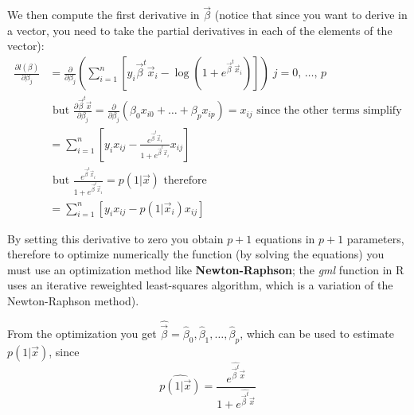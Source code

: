     We then compute the first derivative in $\vec{\beta}$ (notice that since you want to derive in a vector, you need to take the partial derivatives in each of the elements of the vector):
    \begin{align*}
    \frac{\partial l(\beta)}{\partial \beta_j}
    &=\frac{\partial}{\partial \beta_j}\left(\sum_{i=1}^{n}\left[y_i\vec{\beta}^t\vec{x}_i-\log\left(1+e^{\vec{\beta}^t\vec{x}_i}\right)\right]\right) \; j = 0,\,\dots,\,p \\
    & \text{ but } \frac{\partial\vec{\beta}^t\vec{x}}{\partial\beta_j} 
      = \frac{\partial}{\partial\beta_j}(\beta_0 x_{i0} + \dots +\beta_p x_{ip}) = x_{ij} \text{ since the other terms simplify}\\
    &=\sum_{i=1}^{n}\left[y_ix_{ij}-\frac{e^{\vec{\beta}^t\vec{x}_i}}{1+e^{\vec{\beta}^t\vec{x}_i}}x_{ij}\right] \\
    & \text{ but } \frac{e^{\vec{\beta}^{t}\vec{x}_i}} {1+e^{\vec{\beta}^{t}\vec{x}_i}} = p(1|\vec{x}) \text{ therefore} \\
    &=\sum_{i=1}^{n}\left[y_ix_{ij}-p(1|\vec{x}_i)x_{ij}\right]
    \end{align*}
    
    By setting this derivative to zero you obtain $p+1$ equations in $p+1$ parameters, therefore to optimize numerically the function (by solving the equations) you must use an optimization method like \textbf{Newton-Raphson}; the \textit{gml} function in R uses an iterative reweighted least-squares algorithm, which is a variation of the Newton-Raphson method).

    From the optimization you get $\hat{\vec{\beta}} = \hat{\beta}_0, \hat{\beta}_1, \dots, \hat{\beta}_p $, which can be used to estimate $p(1|\vec{x})$, since
    $$\hat{p(1|\vec{x})} = \frac{e^{\hat{\vec{\beta}^t}\vec{x}}}{1+e^{\hat{\vec{\beta}^t}\vec{x}}}$$
